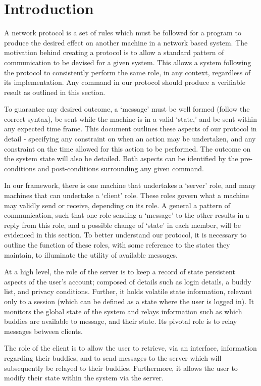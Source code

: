 \label{protocol_spec}
\section{Introduction}

A network protocol is a set of rules which must be followed for a program to produce the desired effect on another machine in a network based system. The motivation behind creating a protocol is to allow a standard pattern of communication to be devised for a given system. This allows a system following the protocol to consistently perform the same role, in any context, regardless of its implementation. Any command in our protocol should produce a verifiable result as outlined in this section.

To guarantee any desired outcome, a `message' must be well formed (follow the correct syntax), be sent while the machine is in a valid `state,' and be sent within any expected time frame. This document outlines these aspects of our protocol in detail - specifying any constraint on when an action may be undertaken, and any constraint on the time allowed for this action to be performed. The outcome on the system state will also be detailed. Both aspects can be identified by the pre-conditions and post-conditions surrounding any given command.

In our framework, there is one machine that undertakes a `server' role, and many machines that can undertake a `client' role. These roles govern what a machine may validly send or receive, depending on its role. A general a pattern of communication, such that one role sending a `message' to the other results in a reply from this role, and a possible change of `state' in each member, will be evidenced in this section. To better understand our protocol, it is necessary to outline the function of these roles, with some reference to the states they maintain, to illuminate the utility of available messages.

At a high level, the role of the server is to keep a record of state persistent aspects of the user's account; composed of details such as login details, a buddy list, and privacy conditions. Further, it holds volatile state information, relevant only to a session (which can be defined as a state where the user is logged in). It monitors the global state of the system and relays information such as which buddies are available to message, and their state. Its pivotal role is to relay messages between clients. 

The role of the client is to allow the user to retrieve, via an interface, information regarding their buddies, and to send messages to the server which will subsequently be relayed to their buddies. Furthermore, it allows the user to modify their state within the system via the server.

